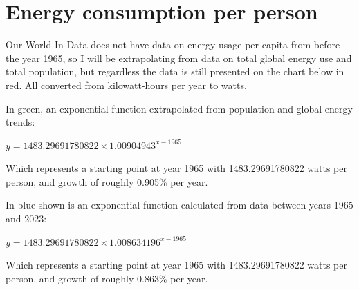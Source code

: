 \documentclass{article}
\begin{document}
	\pagebreak
	
	\section{Energy consumption per person}
	
	Our World In Data does not have data on energy usage per capita from before the year 1965, so I will be extrapolating from data on total global energy use and total population, but regardless the data is still presented on the chart below in red. All converted from kilowatt-hours per year to watts.
	
	\bigskip
	
	In green, an exponential function extrapolated from population and global energy trends:
	
	
	\begin{center}
		{\large $ y = 1483.29691780822 \times 1.00904943^{x-1965} $}
	\end{center}
	
	\noindent Which represents a starting point at year 1965 with 1483.29691780822 watts per person, and growth of roughly 0.905\% per year.
	
	\medskip
	
	In blue shown is an exponential function calculated from data between years 1965 and 2023:
	
	\begin{center}
		{\large $ y = 1483.29691780822 \times 1.008634196^{x-1965} $}
	\end{center}
	
	\noindent Which represents a starting point at year 1965 with 1483.29691780822 watts per person, and growth of roughly 0.863\% per year.
	
\end{document}
